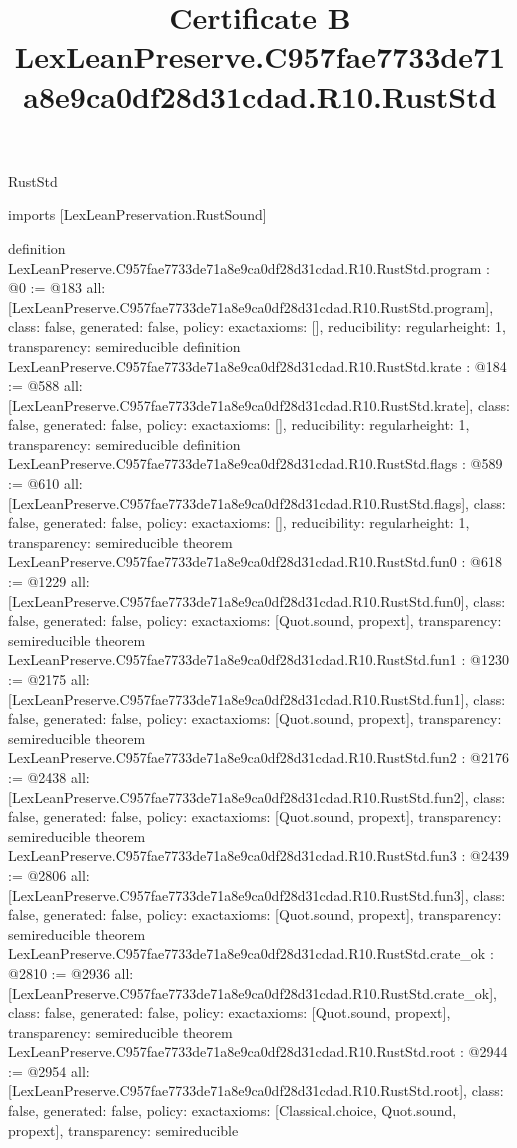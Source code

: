\begin{lexlean}{RustStd}
\title{Certificate B LexLeanPreserve.C957fae7733de71a8e9ca0df28d31cdad.R10.RustStd}
\begin{coremodule}
imports [LexLeanPreservation.RustSound]

definition LexLeanPreserve.C957fae7733de71a8e9ca0df28d31cdad.R10.RustStd.program : @0 := @183 {
  all: [LexLeanPreserve.C957fae7733de71a8e9ca0df28d31cdad.R10.RustStd.program],
  class: false,
  generated: false,
  policy: exact{axioms: []},
  reducibility: regular{height: 1},
  transparency: semireducible
}
definition LexLeanPreserve.C957fae7733de71a8e9ca0df28d31cdad.R10.RustStd.krate : @184 := @588 {
  all: [LexLeanPreserve.C957fae7733de71a8e9ca0df28d31cdad.R10.RustStd.krate],
  class: false,
  generated: false,
  policy: exact{axioms: []},
  reducibility: regular{height: 1},
  transparency: semireducible
}
definition LexLeanPreserve.C957fae7733de71a8e9ca0df28d31cdad.R10.RustStd.flags : @589 := @610 {
  all: [LexLeanPreserve.C957fae7733de71a8e9ca0df28d31cdad.R10.RustStd.flags],
  class: false,
  generated: false,
  policy: exact{axioms: []},
  reducibility: regular{height: 1},
  transparency: semireducible
}
theorem LexLeanPreserve.C957fae7733de71a8e9ca0df28d31cdad.R10.RustStd.fun0 : @618 := @1229 {
  all: [LexLeanPreserve.C957fae7733de71a8e9ca0df28d31cdad.R10.RustStd.fun0],
  class: false,
  generated: false,
  policy: exact{axioms: [Quot.sound, propext]},
  transparency: semireducible
}
theorem LexLeanPreserve.C957fae7733de71a8e9ca0df28d31cdad.R10.RustStd.fun1 : @1230 := @2175 {
  all: [LexLeanPreserve.C957fae7733de71a8e9ca0df28d31cdad.R10.RustStd.fun1],
  class: false,
  generated: false,
  policy: exact{axioms: [Quot.sound, propext]},
  transparency: semireducible
}
theorem LexLeanPreserve.C957fae7733de71a8e9ca0df28d31cdad.R10.RustStd.fun2 : @2176 := @2438 {
  all: [LexLeanPreserve.C957fae7733de71a8e9ca0df28d31cdad.R10.RustStd.fun2],
  class: false,
  generated: false,
  policy: exact{axioms: [Quot.sound, propext]},
  transparency: semireducible
}
theorem LexLeanPreserve.C957fae7733de71a8e9ca0df28d31cdad.R10.RustStd.fun3 : @2439 := @2806 {
  all: [LexLeanPreserve.C957fae7733de71a8e9ca0df28d31cdad.R10.RustStd.fun3],
  class: false,
  generated: false,
  policy: exact{axioms: [Quot.sound, propext]},
  transparency: semireducible
}
theorem LexLeanPreserve.C957fae7733de71a8e9ca0df28d31cdad.R10.RustStd.crate_ok : @2810 := @2936 {
  all: [LexLeanPreserve.C957fae7733de71a8e9ca0df28d31cdad.R10.RustStd.crate_ok],
  class: false,
  generated: false,
  policy: exact{axioms: [Quot.sound, propext]},
  transparency: semireducible
}
theorem LexLeanPreserve.C957fae7733de71a8e9ca0df28d31cdad.R10.RustStd.root : @2944 := @2954 {
  all: [LexLeanPreserve.C957fae7733de71a8e9ca0df28d31cdad.R10.RustStd.root],
  class: false,
  generated: false,
  policy: exact{axioms: [Classical.choice, Quot.sound, propext]},
  transparency: semireducible
}


\end{coremodule}
\end{lexlean}
